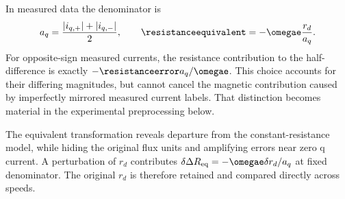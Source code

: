 In measured data the denominator is
\begin{equation}
 a_q=\frac{|i_{q,+}|+|i_{q,-}|}{2},\qquad
 \resistanceequivalent=-\omegae\frac{r_d}{a_q}.
 \label{eq:measured-denominator}
\end{equation}
For opposite-sign measured currents, the resistance contribution to the
half-difference is exactly $-\resistanceerror a_q/\omegae$.
This choice accounts for their differing magnitudes, but cannot cancel the
magnetic contribution caused by imperfectly mirrored measured current labels.
That distinction becomes material in the experimental preprocessing below.

The equivalent transformation reveals departure from the constant-resistance
model, while hiding the original flux units and amplifying errors near zero q
current. A perturbation of $r_d$ contributes
$\delta\Delta R_{\mathrm{eq}}=-\omegae\delta r_d/a_q$ at fixed denominator.
The original $r_d$ is therefore retained and compared directly across speeds.
